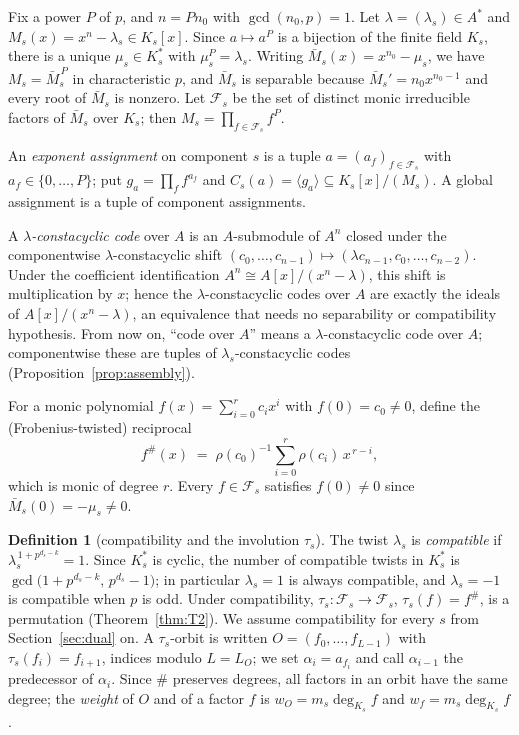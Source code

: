 \documentclass[10pt,journal,draftclsnofoot,onecolumn]{IEEEtran}
\theoremstyle{definition}
\newtheorem{definition}[theorem]{Definition}
\theoremstyle{remark}
\begin{document}
Fix a power \(P\) of \(p\), and \(n = P n_0\) with
\(\gcd(n_0, p) = 1\). Let \(\lambda = (\lambda_s) \in A^*\) and
\(M_s(x) = x^n - \lambda_s \in K_s[x]\). Since \(a \mapsto a^P\) is a
bijection of the finite field \(K_s\), there is a unique \(\mu_s \in K_s^*\)
with \(\mu_s^P = \lambda_s\). Writing \(\bar M_s(x) = x^{n_0} - \mu_s\), we
have \(M_s = \bar M_s^{\,P}\) in characteristic \(p\), and \(\bar M_s\) is
separable because \(\bar M_s' = n_0 x^{n_0-1}\) and every root of
\(\bar M_s\) is nonzero. Let \(\mathcal{F}_s\) be the set of distinct
monic irreducible factors of \(\bar M_s\) over \(K_s\); then
\(M_s = \prod_{f \in \mathcal{F}_s} f^P\).

An \emph{exponent assignment} on component \(s\) is a tuple
\(a = (a_f)_{f \in \mathcal{F}_s}\) with \(a_f \in \{0, \dots, P\}\); put
\(g_a = \prod_f f^{a_f}\) and \(C_s(a) = \langle g_a \rangle \subseteq
K_s[x]/(M_s)\). A global assignment is a tuple of component assignments.

A \emph{\(\lambda\)-constacyclic code} over \(A\) is an \(A\)-submodule of
\(A^n\) closed under the componentwise \(\lambda\)-constacyclic shift
\((c_0,\dots,c_{n-1}) \mapsto (\lambda c_{n-1}, c_0, \dots, c_{n-2})\).
Under the coefficient identification \(A^n \cong A[x]/(x^n-\lambda)\), this
shift is multiplication by \(x\); hence the \(\lambda\)-constacyclic codes
over \(A\) are exactly the ideals of \(A[x]/(x^n-\lambda)\), an equivalence
that needs no separability or compatibility hypothesis. From now on,
``code over \(A\)'' means a \(\lambda\)-constacyclic code over \(A\);
componentwise these are tuples of \(\lambda_s\)-constacyclic codes
(Proposition~\ref{prop:assembly}).

For a monic polynomial \(f(x) = \sum_{i=0}^{r} c_i x^i\) with
\(f(0) = c_0 \ne 0\), define the (Frobenius-twisted) reciprocal
\[
f^{\#}(x) \;=\; \rho(c_0)^{-1} \sum_{i=0}^{r} \rho(c_i)\, x^{\,r-i},
\]
which is monic of degree \(r\). Every \(f \in \mathcal{F}_s\) satisfies
\(f(0) \ne 0\) since \(\bar M_s(0) = -\mu_s \ne 0\).

\begin{definition}[compatibility and the involution \(\tau_s\)]
The twist \(\lambda_s\) is \emph{compatible} if
\(\lambda_s^{\,1 + p^{d_s - k}} = 1\). Since \(K_s^*\) is cyclic, the
number of compatible twists in \(K_s^*\) is
\(\gcd\big(1 + p^{d_s-k},\, p^{d_s} - 1\big)\); in particular
\(\lambda_s = 1\) is always compatible, and \(\lambda_s = -1\) is
compatible when \(p\) is odd.
Under compatibility, \(\tau_s : \mathcal{F}_s \to \mathcal{F}_s\),
\(\tau_s(f) = f^{\#}\), is a permutation (Theorem~\ref{thm:T2}). We
assume compatibility for every \(s\) from Section~\ref{sec:dual} on.
A \(\tau_s\)-orbit is written \(O = (f_0, \dots, f_{L-1})\) with
\(\tau_s(f_i) = f_{i+1}\), indices modulo \(L = L_O\); we set
\(\alpha_i = a_{f_i}\) and call \(\alpha_{i-1}\) the predecessor of
\(\alpha_i\). Since \(\#\) preserves degrees, all factors in an orbit
have the same degree; the \emph{weight} of \(O\) and of a factor \(f\) is
\(w_O = m_s \deg_{K_s} f\) and \(w_f = m_s \deg_{K_s} f\).
\end{definition}
\end{document}
